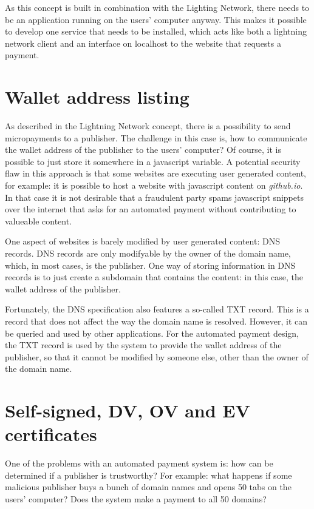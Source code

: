 As this concept is built in combination with the Lighting Network, there needs to be an application running on the users' computer anyway. This makes it possible to develop one service that needs to be installed, which acts like both a lightning network client and an interface on localhost to the website that requests a payment.


\section{Wallet address listing}

As described in the Lightning Network concept, there is a possibility to send micropayments to a publisher. The challenge in this case is, how to communicate the wallet address of the publisher to the users' computer? Of course, it is possible to just store it somewhere in a javascript variable. A potential security flaw in this approach is that some websites are executing user generated content, for example: it is possible to host a website with javascript content on \textit{github.io}. In that case it is not desirable that a fraudulent party spams javascript snippets over the internet that asks for an automated payment without contributing to valueable content. 

One aspect of websites is barely modified by user generated content: DNS records. DNS records are only modifyable by the owner of the domain name, which, in most cases, is the publisher. One way of storing information in DNS records is to just create a subdomain that contains the content: in this case, the wallet address of the publisher. 

Fortunately, the DNS specification also features a so-called TXT record. This is a record that does not affect the way the domain name is resolved. However, it can be queried and used by other applications. For the automated payment design, the TXT record is used by the system to provide the wallet address of the publisher, so that it cannot be modified by someone else, other than the owner of the domain name. 

\section{Self-signed, DV, OV and EV certificates}

One of the problems with an automated payment system is: how can be determined if a publisher is trustworthy? For example: what happens if some malicious publisher buys a bunch of domain names and opens 50 tabs on the users' computer? Does the system make a payment to all 50 domains? 

